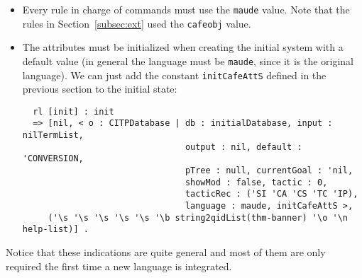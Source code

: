 \begin{itemize}
{\begin{verbatim}
  rl [cafe-specs] :
     < O : X@Database | input : ('cafeOBJ`language`..@Command@), output : nil ,
                        language : L, Atts >
  => < O : X@Database | input : nilTermList, output : ('\n '\b 'CafeOBJ 'selected 
                                                      'as 'current 'specification
                                                      'language. '\o '\n),
                        language : cafeobj, Atts > .
\end{verbatim}
}

\item
Every rule in charge of commands must use the \verb"maude" value. Note that the
rules in Section~\ref{subsec:ext} used the \verb"cafeobj" value.

\item
The attributes must be initialized when creating the initial system with a default
value (in general the language must be \verb"maude", since it is the original
language). We can just add the constant \verb"initCafeAttS" defined in the previous
section to the initial state:

{\codesize
\begin{verbatim}
  rl [init] : init 
  => [nil, < o : CITPDatabase | db : initialDatabase, input : nilTermList,
                                output : nil, default : 'CONVERSION,
                                pTree : null, currentGoal : 'nil,
                                showMod : false, tactic : 0,
                                tacticRec : ('SI 'CA 'CS 'TC 'IP),
                                language : maude, initCafeAttS >,
     ('\s '\s '\s '\s '\s '\b string2qidList(thm-banner) '\o '\n help-list)] .
\end{verbatim}
}

\end{itemize}

Notice that these indications are quite general and most of them are only required
the first time a new language is integrated.


